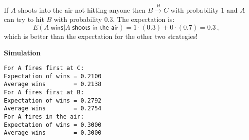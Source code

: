  If $A$ shoots into the air not hitting anyone then $B\stackrel{H}{\longrightarrow}C$ with probability $1$ and $A$ can try to hit $B$ with probability $0.3$. The expectation is:
\[
E(A \;\textsf{wins}|A\;\textsf{shoots in the air}) = 1\cdot(0.3) + 0\cdot(0.7)=0.3\,,
\]
which is better than the expectation for the other two strategies!

\textbf{Simulation}
\begin{verbatim}
For A fires first at C:
Expectation of wins = 0.2100
Average wins        = 0.2138
For A fires first at B:
Expectation of wins = 0.2792
Average wins        = 0.2754
For A fires in the air:
Expectation of wins = 0.3000
Average wins        = 0.3000
\end{verbatim}

